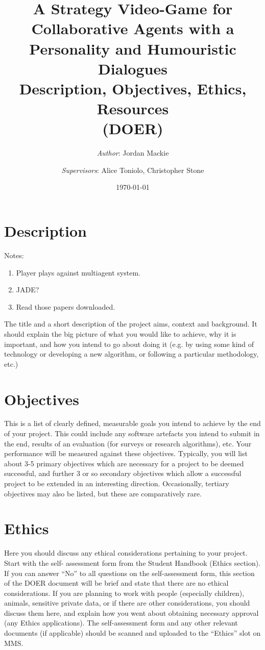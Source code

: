 \documentclass[12pt]{extarticle}
\title{%
  A Strategy Video-Game for Collaborative Agents with a Personality and Humouristic Dialogues \\
  \vspace{5mm} 
  \large Description, Objectives, Ethics, Resources \\
  (DOER)}
\author{\textit{Author}: Jordan Mackie \and 
{\textit{Supervisors}: Alice Toniolo, Christopher Stone}}
\date{\today}
\begin{document}
\maketitle


\section*{Description}

Notes:

\begin{enumerate}
	\item Player plays against multiagent system.
	\item JADE? 
	\item Read those papers downloaded.
\end{enumerate}


\noindent The title and a short description of the project aims,
context and background. It should explain the big
picture of what you would like to achieve, why it is
important, and how you intend to go about doing it (e.g.
by using some kind of technology or developing a new
algorithm, or following a particular methodology, etc.)

\section*{Objectives}

This is a list of clearly defined, measurable goals you
intend to achieve by the end of your project. This could
include any software artefacts you intend to submit in
the end, results of an evaluation (for surveys or research
algorithms), etc. Your performance will be measured
against these objectives.
Typically, you will list about 3-5 primary objectives
which are necessary for a project to be deemed
successful, and further 3 or so secondary objectives
which allow a successful project to be extended in an
interesting direction. Occasionally, tertiary objectives
may also be listed, but these are comparatively rare.

\section*{Ethics}

Here you should discuss any ethical considerations
pertaining to your project. Start with the self-
assessment form from the Student Handbook (Ethics
section). If you can answer “No” to all questions on the
self-assessment form, this section of the DOER
document will be brief and state that there are no ethical
considerations.
If you are planning to work with people (especially
children), animals, sensitive private data, or if there are
other considerations, you should discuss them here, and
explain how you went about obtaining necessary
approval (any Ethics applications).
The self-assessment form and any other relevant
documents (if applicable) should be scanned and
uploaded to the “Ethics” slot on MMS.
\end{document}
